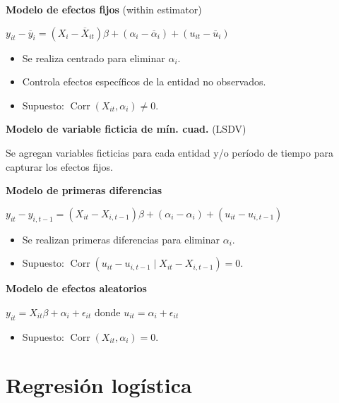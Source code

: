 \documentclass[10pt, a4paper, landscape]{article}
\DeclareMathOperator{\Corr}{Corr}
\begin{document}
\begin{multicols}{3}
\textbf{Modelo de efectos fijos} (within estimator)

\begin{center}
	\( y_{it} - \overline{y}_{i} = (X_{i} - \overline{X}_{it}) \beta + (\alpha_{i} - \overline{\alpha}_{i}) + (u_{it} - \overline{u}_{i}) \)
\end{center}

\begin{itemize}[leftmargin=*]
	\item Se realiza centrado para eliminar \( \alpha_{i} \).
	\item Controla efectos específicos de la entidad no observados.
	\item Supuesto: \( \Corr(X_{it}, \alpha_i) \neq 0 \).
\end{itemize}

\textbf{Modelo de variable ficticia de mín. cuad.} (LSDV)

Se agregan variables ficticias para cada entidad y/o período de tiempo para capturar los efectos fijos.

\textbf{Modelo de primeras diferencias}

\begin{center}
	\( y_{it} - y_{i, t - 1} = (X_{it} - X_{i, t - 1}) \beta + (\alpha_{i} - \alpha_{i}) + (u_{it} - u_{i, t - 1}) \)
\end{center}

\begin{itemize}[leftmargin=*]
	\item Se realizan primeras diferencias para eliminar \( \alpha_{i} \).
	\item Supuesto: \( \Corr(u_{it} - u_{i, t - 1} \mid X_{it} - X_{i, t - 1}) = 0 \).
\end{itemize}

\textbf{Modelo de efectos aleatorios}

\begin{center}
	\( y_{it} = X_{it} \beta + \alpha_{i} + \epsilon_{it} \) donde \( u_{it} = \alpha_{i} + \epsilon_{it} \)
\end{center}

\begin{itemize}[leftmargin=*]
	\item Supuesto: \( \Corr(X_{it}, \alpha_i) = 0 \).
\end{itemize}

\section*{Regresión logística}


\end{multicols}
\end{document}

